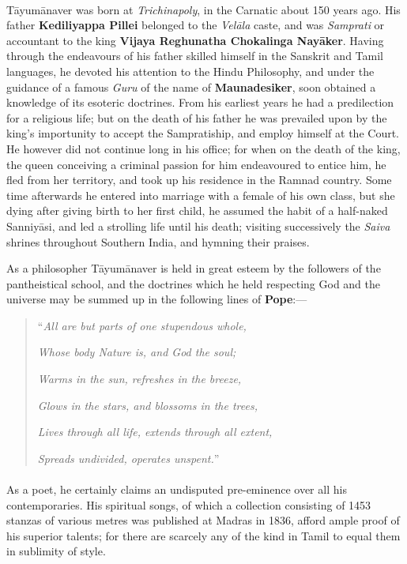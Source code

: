\documentclass{article}
\begin{document}
\paragraph{}
T\={a}yum\={a}naver was born at \emph{Trichinapoly}, in the Carnatic about 150 years ago. His father \textbf{Kediliyappa Pillei} belonged to the \emph{Vel\={a}la} caste, and was \emph{Samprati} or accountant to the king \textbf{Vijaya Reghunatha Chokalinga Nay\={a}ker}. Having through the endeavours of his father skilled himself in the Sanskrit and Tamil languages, he devoted his attention to the Hindu Philosophy, and under the guidance of a famous \emph{Guru} of the name of \textbf{Maunadesiker}, soon obtained a knowledge of its esoteric doctrines. From his earliest years he had a predilection for a religious life; but on the death of his father he was prevailed upon by the king's importunity to accept the Sampratiship, and employ himself at the Court. He however did not continue long in his office; for when on the death of the king, the queen conceiving a criminal passion for him endeavoured to entice him, he fled from her territory, and took up his residence in the Ramnad country. Some time afterwards he entered into marriage with a female of his own class, but she dying after giving birth to her first child, he assumed the habit of a half-naked Sanniy\={a}si, and led a strolling life until his death; visiting successively the \emph{Saiva} shrines throughout Southern India, and hymning their praises.

As a philosopher T\={a}yum\={a}naver is held in great esteem by the followers of the pantheistical school, and the doctrines which he held respecting God and the universe may be summed up in the following lines of \textbf{Pope}:---
\begin{quotation}\small
``\emph{All are but parts of one stupendous whole,}

\emph{Whose body Nature is, and God the soul;}

\emph{Warms in the sun, refreshes in the breeze,}

\emph{Glows in the stars, and blossoms in the trees,}

\emph{Lives through all life, extends through all extent,}

\emph{Spreads undivided, operates unspent.}''
\end{quotation}
\paragraph{}
As a poet, he certainly claims an undisputed pre-eminence over all his contemporaries. His spiritual songs, of which a collection consisting of 1453 stanzas of various metres was published at Madras in 1836, afford ample proof of his superior talents; for there are scarcely any of the kind in Tamil to equal them in sublimity of style.
\end{document}
